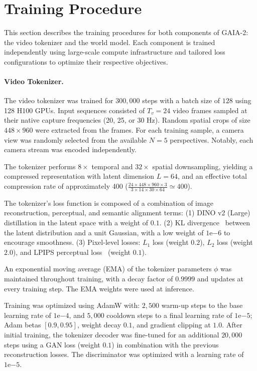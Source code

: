 \section{Training Procedure}
\label{section:training-procedure}
This section describes the training procedures for both components of GAIA-2: the video tokenizer and the world model. Each component is trained independently using large-scale compute infrastructure and tailored loss configurations to optimize their respective objectives.

\paragraph{Video Tokenizer.} The video tokenizer was trained for $300{\scriptstyle,}000$ steps with a batch size of $128$ using 128 H100 GPUs. Input sequences consisted of $T_v=24$ video frames sampled at their native capture frequencies (20, 25, or 30 Hz). Random spatial crops of size $448 \times 960$ were extracted from the frames. For each training sample, a camera view was randomly selected from the available $N = 5$ perspectives. Notably, each camera stream was encoded independently.

The tokenizer performs $8\times$ temporal and $32\times$ spatial downsampling, yielding a compressed representation with latent dimension $L = 64$, and an effective total compression rate of approximately 400 ($\frac{24 \times 448 \times 960 \times 3}{3 \times 14 \times 30 \times 64} \simeq 400$).

The tokenizer’s loss function is composed of a combination of image reconstruction, perceptual, and semantic alignment terms: (1) DINO v2 (Large)~\cite{oquab2023dinov2} distillation in the latent space with a weight of $0.1$. (2) KL divergence~\cite{kingma14} between the latent distribution and a unit Gaussian, with a low weight of $1\mathrm{e}{-6}$ to encourage smoothness. (3) Pixel-level losses: $L_1$ loss (weight $0.2$), $L_2$ loss (weight $2.0$), and LPIPS perceptual loss~\cite{zhang2018unreasonable} (weight $0.1$).

An exponential moving average (EMA) of the tokenizer parameters $\phi$ was maintained throughout training, with a decay factor of $0.9999$ and updates at every training step. The EMA weights were used at inference.

Training was optimized using AdamW with: $2{\scriptstyle,}500$ warm-up steps to the base learning rate of $1\mathrm{e}{-4}$, and $5{\scriptstyle,}000$ cooldown steps to a final learning rate of $1\mathrm{e}{-5}$; Adam betas $[0.9, 0.95]$, weight decay $0.1$, and gradient clipping at $1.0$. After initial training, the tokenizer decoder was fine-tuned for an additional $20{\scriptstyle,}000$ steps using a GAN loss (weight $0.1$) in combination with the previous reconstruction losses. The discriminator was optimized with a learning rate of $1\mathrm{e}{-5}$.



